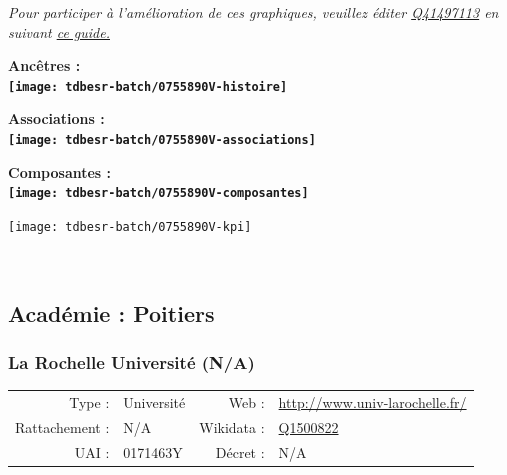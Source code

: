 \documentclass[12pt,french,]{article}
\begin{document}
\textit{\scriptsize Pour participer à l'amélioration de ces graphiques, veuillez éditer  \href{https://www.wikidata.org/entity/Q41497113}{Q41497113}  en suivant \href{https://github.com/cpesr/wikidataESR/blob/master/Rmd/wikidataESR.md}{ce guide.}}

\vspace{1cm}  
\begin{minipage}[b]{0.50\textwidth}\begin{center} \bf Ancêtres : \\  
\texttt{[image: tdbesr-batch/0755890V-histoire]} \end{center}\end{minipage}\begin{minipage}[b]{0.50\textwidth}\begin{center} \bf Associations : \\  
\texttt{[image: tdbesr-batch/0755890V-associations]} \end{center}\end{minipage}

\hrulefill

\begin{center} \bf Composantes : \\  
\texttt{[image: tdbesr-batch/0755890V-composantes]} \end{center}

\begin{center}\texttt{[image: tdbesr-batch/0755890V-kpi]} \end{center}\checkoddpage

\ifoddpage ~\newpage \fi   

\hypertarget{acaduxe9mie-poitiers}{%
\subsection{Académie : Poitiers}\label{acaduxe9mie-poitiers}}

\hypertarget{la-rochelle-universituxe9-na}{%
\subsubsection{La Rochelle Université
(N/A)}\label{la-rochelle-universituxe9-na}}

\begin{tabular*}{\textwidth}{rp{5cm}rl}  
\hline  
Type : & Université & Web : &\href{http://www.univ-larochelle.fr/}{http://www.univ-larochelle.fr/} \\  
Rattachement : & N/A & Wikidata : & \href{https://www.wikidata.org/entity/Q1500822}{Q1500822} \\  
UAI : & 0171463Y & Décret : & N/A \\  
\hline  
\end{tabular*}
\end{document}
